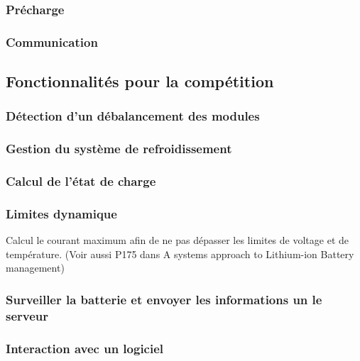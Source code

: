 		\subsubsection{Précharge}
		
		\subsubsection{Communication}
	
	\subsection{Fonctionnalités pour la compétition}
		\subsubsection{Détection d'un débalancement des modules}	
	
		\subsubsection{Gestion du système de refroidissement}
		
		\subsubsection{Calcul de l'état de charge}
		
		\subsubsection{Limites dynamique}
		Calcul le courant maximum afin de ne pas dépasser les limites de voltage et de température. (Voir aussi P175 dans A systems approach to Lithium-ion Battery management)
		
		\subsubsection{Surveiller la batterie et envoyer les informations un le serveur}
		
		\subsubsection{Interaction avec un logiciel}
		
		